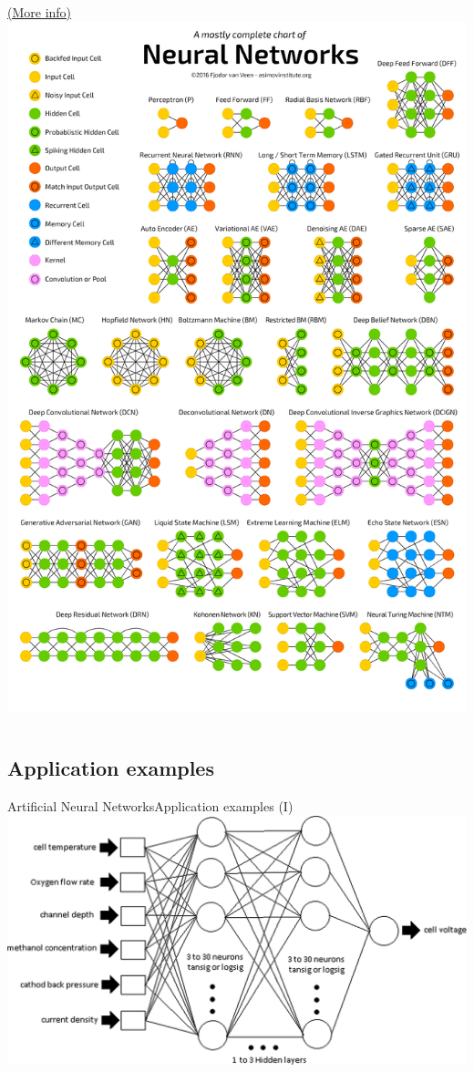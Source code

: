 \documentclass[10pt,compress]{beamer} %
\begin{document}
\begin{frame}[plain]{}{}
\vspace{-0.2cm}
\begin{center}
    \begin{columns}
	\href{http://www.asimovinstitute.org/neural-network-zoo/}{(More info)}
	\includegraphics[width=0.7\linewidth]{figs/neuralnetworks.png}
	\end{columns}
\end{center}
\end{frame}

\subsection{Application examples}
\begin{frame}{Artificial Neural Networks}{Application examples (I)}
	\centering\includegraphics[width=0.9\linewidth]{figs/control.png}
\end{frame}
\end{document}
